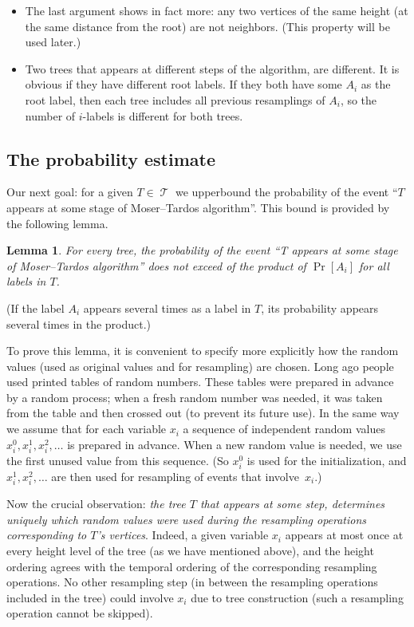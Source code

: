 \documentclass[12pt]{article}
\DeclareMathOperator{\Tr}{\mathcal{T}}
\newtheorem{lemma}{Lemma}
\begin{document}
\begin{itemize}
\item The last argument shows in fact more: any two vertices of the same height (at the same distance from the root) are not neighbors. (This property will be used later.)

\item Two trees that appears at different steps of the algorithm, are different. It is obvious if they have different root labels. If they both have some $A_i$ as the root label, then each tree includes all previous resamplings of $A_i$, so the number of $i$-labels is different for both trees.

\end{itemize}

\subsection{The probability estimate}

Our next goal: for a given $T\in \Tr$ we upperbound the probability of the event ``$T$ appears at some stage of Moser--Tardos algorithm''. This bound is provided by the following lemma.

\begin{lemma}\label{treeprob}
For every tree, the probability of the event ``T appears at some stage of Moser--Tardos algorithm'' does not exceed of the product of $\Pr[A_i]$ for all labels in $T$.
\end{lemma}

\noindent
(If the label $A_i$ appears several times as a label in $T$, its probability appears several times in the product.)

To prove this lemma, it is convenient to specify more explicitly how the random values (used as original values and for resampling) are chosen. Long ago people used printed tables of random numbers. These tables were prepared in advance by a random process; when a fresh random number was needed, it was taken from the table and then crossed out (to prevent its future use). In the same way we assume that for each variable $x_i$ a sequence of independent random values $x_i^0, x_i^1, x_i^2,\ldots$ is prepared in advance. When a new random value is needed, we use the first unused value from this sequence. (So $x_i^0$ is used for the initialization, and $x_i^1,x_i^2,\ldots$ are then used for resampling of events that involve~$x_i$.)

Now the crucial observation: \emph{the tree $T$ that appears at some step, determines uniquely which random values were used during the resampling operations
corresponding to $T$'s vertices}. Indeed, a given variable $x_i$ appears at most once at every height level of the tree (as we have mentioned above), and the height ordering agrees with the temporal ordering of the corresponding resampling operations. No other resampling step (in between the resampling operations included in the tree) could involve $x_i$ due to tree construction (such a resampling operation cannot be skipped).
\end{document}
